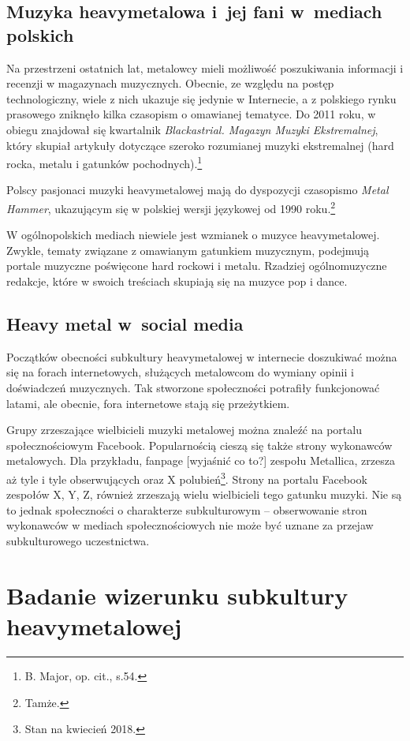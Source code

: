 \documentclass[12pt, a4paper, titlepage]{report}
\begin{document}
\section{Muzyka heavymetalowa i~jej fani w~mediach polskich}
Na przestrzeni ostatnich lat, metalowcy mieli możliwość poszukiwania informacji i recenzji w magazynach muzycznych. Obecnie, ze względu na postęp technologiczny, wiele z nich ukazuje się jedynie w Internecie, a z polskiego rynku prasowego zniknęło kilka czasopism o omawianej tematyce. Do 2011 roku, w obiegu znajdował się kwartalnik \textit{Blackastrial. Magazyn Muzyki Ekstremalnej}, który skupiał artykuły dotyczące szeroko rozumianej muzyki ekstremalnej (hard rocka, metalu i gatunków pochodnych).\footnote{B. Major, op. cit., s.54.}  

Polscy pasjonaci muzyki heavymetalowej mają do dyspozycji czasopismo \textit{Metal Hammer}, ukazującym się w polskiej wersji językowej od 1990 roku.\footnote{Tamże.}


W ogólnopolskich mediach niewiele jest wzmianek o muzyce heavymetalowej. Zwykle, tematy związane z omawianym gatunkiem muzycznym, podejmują portale muzyczne poświęcone hard rockowi i metalu. Rzadziej ogólnomuzyczne redakcje, które w swoich treściach skupiają się na muzyce pop i dance. 
\section{Heavy metal w~social media}
Początków obecności subkultury heavymetalowej w internecie doszukiwać można się na forach internetowych, służących metalowcom do wymiany opinii i doświadczeń muzycznych. Tak stworzone społeczności potrafiły funkcjonować latami, ale obecnie, fora internetowe stają się przeżytkiem. 

Grupy zrzeszające wielbicieli muzyki metalowej można znaleźć na portalu społecznościowym Facebook. Popularnością cieszą się także strony wykonawców metalowych. Dla przykładu, fanpage [wyjaśnić co to?] zespołu Metallica, zrzesza aż tyle i tyle obserwujących oraz X polubień\footnote{Stan na kwiecień 2018.}. Strony na portalu Facebook zespołów X, Y, Z, również zrzeszają wielu wielbicieli tego gatunku muzyki. Nie są to jednak społeczności o charakterze subkulturowym -- obserwowanie stron wykonawców w mediach społecznościowych nie może być uznane za przejaw subkulturowego uczestnictwa. 

\chapter{Badanie wizerunku subkultury heavymetalowej}
\end{document}
